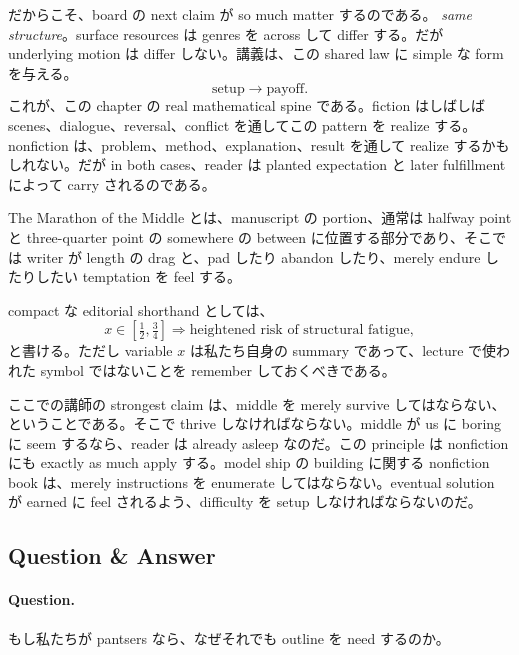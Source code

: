 だからこそ、board の next claim が so much matter するのである。 \textit{same structure}。surface resources は genres を across して differ する。だが underlying motion は differ しない。講義は、この shared law に simple な form を与える。
\begin{equation}
\text{setup} \to \text{payoff}.
\end{equation}
これが、この chapter の real mathematical spine である。fiction はしばしば scenes、dialogue、reversal、conflict を通してこの pattern を realize する。nonfiction は、problem、method、explanation、result を通して realize するかもしれない。だが in both cases、reader は planted expectation と later fulfillment によって carry されるのである。

\begin{definition}
The Marathon of the Middle とは、manuscript の portion、通常は halfway point と three-quarter point の somewhere の between に位置する部分であり、そこでは writer が length の drag と、pad したり abandon したり、merely endure したりしたい temptation を feel する。
\end{definition}

compact な editorial shorthand としては、
\begin{equation}
x \in \left[\tfrac12,\tfrac34\right] \Rightarrow \text{heightened risk of structural fatigue},
\end{equation}
と書ける。ただし variable \(x\) は私たち自身の summary であって、lecture で使われた symbol ではないことを remember しておくべきである。

ここでの講師の strongest claim は、middle を merely survive してはならない、ということである。そこで thrive しなければならない。middle が us に boring に seem するなら、reader は already asleep なのだ。この principle は nonfiction にも exactly as much apply する。model ship の building に関する nonfiction book は、merely instructions を enumerate してはならない。eventual solution が earned に feel されるよう、difficulty を setup しなければならないのだ。

\subsection{Question \& Answer}

\paragraph{Question.} もし私たちが pantsers なら、なぜそれでも outline を need するのか。

